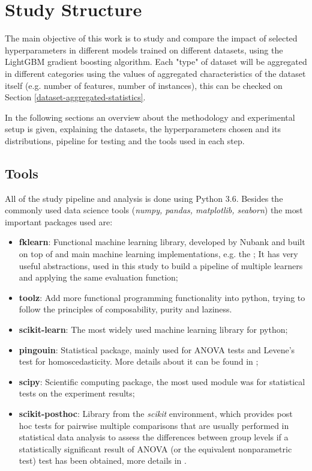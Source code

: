 \chapter{Study Structure}
\label{cap:study-methodology}

The main objective of this work is to study and compare the impact of selected hyperparameters in different models trained on different datasets, using the LightGBM gradient boosting algorithm. Each "type" of dataset will be aggregated in different categories using the values of aggregated characteristics of the dataset itself (e.g. number of features, number of instances), this can be checked on Section \ref{dataset-aggregated-statistics}.

In the following sections an overview about the methodology and experimental setup is given, explaining the datasets, the hyperparameters chosen and its distributions, pipeline for testing and the tools used in each step.

\section{Tools}

All of the study pipeline and analysis is done using Python 3.6. Besides the commonly used data science tools (\textit{numpy, pandas, matplotlib, seaborn}) the most important packages used are:

\begin{itemize}
    \item \textbf{fklearn}: Functional machine learning library, developed by Nubank and built on top of  and main machine learning implementations, e.g. the ; It has very useful abstractions, used in this study to build a pipeline of multiple learners and applying the same evaluation function;
    \item \textbf{toolz}: Add more functional programming functionality into python, trying to follow the principles of composability, purity and laziness.
    \item \textbf{scikit-learn}: The most widely used machine learning library for python;
    \item \textbf{pingouin}: Statistical package, mainly used for ANOVA tests and Levene's test for homoscedasticity. More details about it can be found in \cite{Vallat2018};
    \item \textbf{scipy}: Scientific computing package, the most used module was  for statistical tests on the experiment results;
    \item \textbf{scikit-posthoc}: Library from the \textit{scikit} environment, which provides post hoc tests for pairwise multiple comparisons that are usually performed in statistical data analysis to assess the differences between group levels if a statistically significant result of ANOVA (or the equivalent nonparametric test) test has been obtained, more details in \cite{Terpilowski2019}.

\end{itemize}

